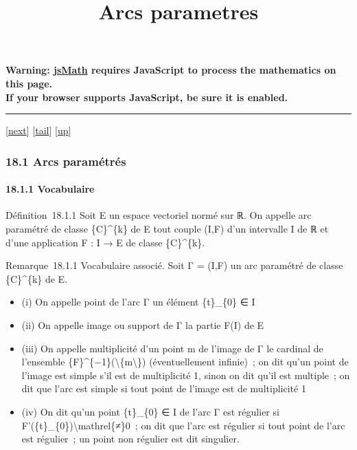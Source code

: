 \documentclass[]{article}
\title{Arcs parametres}
\author{}
\date{}
\begin{document}
\maketitle

\textbf{Warning: \href{http://www.math.union.edu/locate/jsMath}{jsMath}
requires JavaScript to process the mathematics on this page.\\ If your
browser supports JavaScript, be sure it is enabled.}

\begin{center}\rule{3in}{0.4pt}\end{center}

{[}\href{coursse97.html}{next}{]}
{[}\hyperref[tailcoursse96.html]{tail}{]}
{[}\href{coursch19.html\#coursse96.html}{up}{]}

\subsubsection{18.1 Arcs paramétrés}

\paragraph{18.1.1 Vocabulaire}

Définition~18.1.1 Soit E un espace vectoriel normé sur ℝ. On appelle arc
paramétré de classe \{C\}\^{}\{k\} de E tout couple (I,F) d'un
intervalle I de ℝ et d'une application F : I → E de classe
\{C\}\^{}\{k\}.

Remarque~18.1.1 Vocabulaire associé. Soit Γ = (I,F) un arc paramétré de
classe \{C\}\^{}\{k\} de E.

\begin{itemize}
\itemsep1pt\parskip0pt
\item
  (i) On appelle point de l'arc Γ un élément \{t\}\_\{0\} ∈ I
\item
  (ii) On appelle image ou support de Γ la partie F(I) de E
\item
  (iii) On appelle multiplicité d'un point m de l'image de Γ le cardinal
  de l'ensemble \{F\}\^{}\{−1\}(\textbackslash{}\{m\textbackslash{}\})
  (éventuellement infinie)~; on dit qu'un point de l'image est simple
  s'il est de multiplicité 1, sinon on dit qu'il est multiple~; on dit
  que l'arc est simple si tout point de l'image est de multiplicité 1
\item
  (iv) On dit qu'un point \{t\}\_\{0\} ∈ I de l'arc Γ est régulier si
  F'(\{t\}\_\{0\})\textbackslash{}mathrel\{≠\}0~; on dit que l'arc est
  régulier si tout point de l'arc est régulier~; un point non régulier
  est dit singulier.
\end{itemize}
\end{document}
